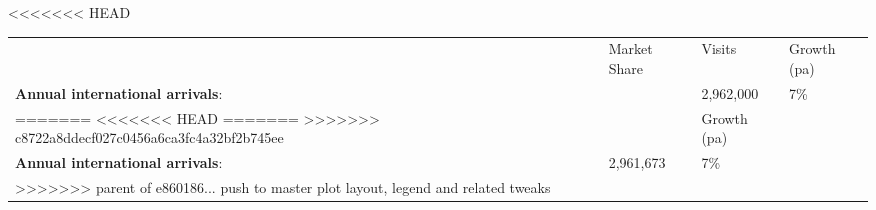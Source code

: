 <<<<<<< HEAD
\begin{tabular}[t]{p{2.95cm}>{\hfill}p{1.35cm}>{\hfill}p{1.1cm}>{\hfill}p{1.7cm}}
   & Market Share & Visits & Growth (pa) \\ 
 \textbf{Annual international arrivals}: &   & 2,962,000 & 7\% \\ 
=======
<<<<<<< HEAD
=======
>>>>>>> c8722a8ddecf027c0456a6ca3fc4a32bf2b745ee
\begin{tabular}[t]{p{4.8cm}>{\hfill}p{1.3cm}>{\hfill}p{1.4cm}}
   &   & Growth (pa) \\ 
 \textbf{Annual international arrivals}: & 2,961,673 & 7\% \\ 
>>>>>>> parent of e860186... push to master plot layout, legend and related tweaks
  \end{tabular}
